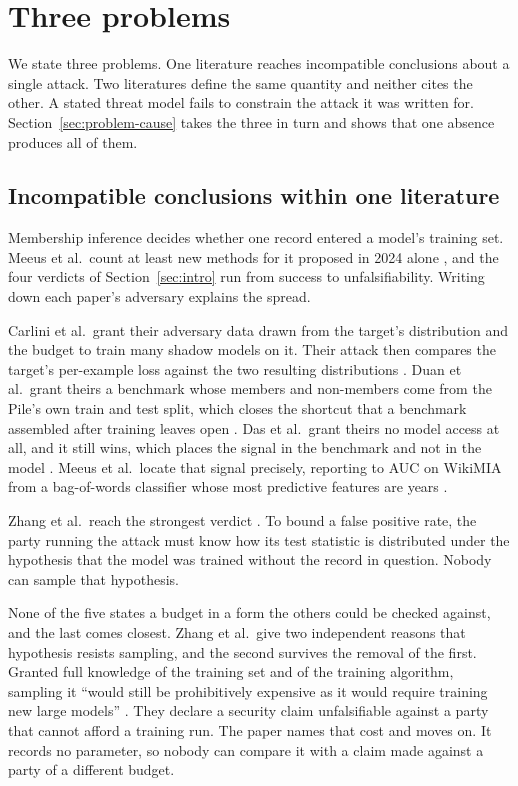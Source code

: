 \section{Three problems}
\label{sec:problem}

We state three problems. One literature reaches incompatible conclusions about
a single attack. Two literatures define the same quantity and neither cites
the other. A stated threat model fails to constrain the attack it was written
for. Section~\ref{sec:problem-cause} takes the three in turn and shows that
one absence produces all of them.

\subsection{Incompatible conclusions within one literature}
\label{sec:problem-one}

Membership inference decides whether one record entered a model's training
set. Meeus et al.\ count at least \MIAnewMethods{} new methods for it proposed
in 2024 alone \cite{MSJFRM25}, and the four verdicts of
Section~\ref{sec:intro} run from success to unfalsifiability. Writing down
each paper's adversary explains the spread.

Carlini et al.\ grant their adversary data drawn from the target's
distribution and the budget to train many shadow models on it. Their attack
then compares the target's per-example loss against the two resulting
distributions
\cite{CCNSTT22}. Duan et al.\ grant theirs a benchmark whose members and
non-members come from the Pile's own train and test split, which closes the
shortcut that a benchmark assembled after training leaves open
\cite{DSMMSZTCEH24}. Das et al.\ grant theirs no model access at all, and it
still wins, which places the signal in the benchmark and not in the model
\cite{DZT25}. Meeus et al.\ locate that signal precisely, reporting
\MIAwikiLo{} to \MIAwikiHi{} AUC on WikiMIA from a bag-of-words classifier whose
most predictive features are years \cite{MSJFRM25}.

Zhang et al.\ reach the strongest verdict \cite{ZDKT25}. To bound a false
positive rate, the party running the attack must know how its test statistic
is distributed under the hypothesis that the model was trained without the
record in question. Nobody can sample that hypothesis.

None of the five states a budget in a form the others could be checked
against, and the last comes closest. Zhang et al.\ give two independent
reasons that hypothesis resists sampling, and the second survives the removal
of the first. Granted full knowledge of the training set and of the training
algorithm, sampling it ``would still be prohibitively expensive as it would
require training new large models'' \cite{ZDKT25}. They declare a security
claim unfalsifiable against a party that cannot afford a training run. The
paper names that cost and moves on. It records no parameter, so nobody can
compare it with a claim made against a party of a different budget.

